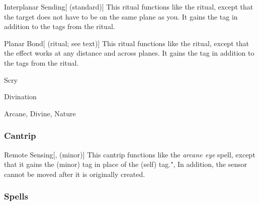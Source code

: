 \lowercase{\hypertarget{spell:Interplanar Sending}{}}\label{spell:Interplanar Sending}
\begin{apability}[\nth{6}]{\hypertarget{spell:Interplanar Sending}{Interplanar Sending}}[ (standard)]
This ritual functions like the  ritual, except that the target does not have to be on the same plane as you.
It gains the  tag in addition to the tags from the  ritual.
\end{apability}
\vspace{0.25em}



\lowercase{\hypertarget{spell:Planar Bond}{}}\label{spell:Planar Bond}
\begin{attuneability}[\nth{7}]{\hypertarget{spell:Planar Bond}{Planar Bond}}[ (ritual; see text)]
This ritual functions like the  ritual, except that the effect works at any distance and across planes.
It gains the  tag in addition to the tags from the  ritual.
\end{attuneability}
\vspace{0.25em}


\newpage
\begin{spellsection}{Scry}

\begin{spellheader}
\end{spellheader}


 Divination

 Arcane, Divine, Nature

\subsubsection{Cantrip}


\begin{freeability}{Remote Sensing}[,  (minor)]
This cantrip functions like the \textit{arcane eye} spell, except that it gains the  (minor) tag in place of the  (self) tag.",
In addition, the sensor cannot be moved after it is originally created.
\end{freeability}

\end{spellsection}


\subsubsection{Spells}


